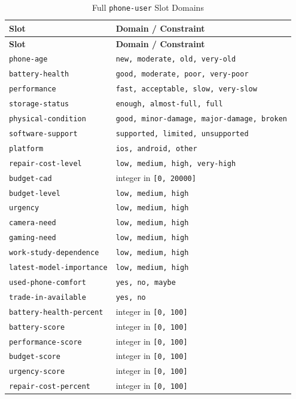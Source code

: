 \documentclass[11pt]{article}
\begin{document}
\begin{longtable}{|L{0.28\textwidth}|L{0.65\textwidth}|}
\caption{Full \texttt{phone-user} Slot Domains}\label{tab:phoneuserslots}\\
\hline
{}
\textbf{Slot} & \textbf{Domain / Constraint} \\ \hline
\hline
\endfirsthead
\hline
{}
\textbf{Slot} & \textbf{Domain / Constraint} \\ \hline
\hline
\endhead
\texttt{phone-age} & \texttt{new, moderate, old, very-old} \\ \hline
\texttt{battery-health} & \texttt{good, moderate, poor, very-poor} \\ \hline
\texttt{performance} & \texttt{fast, acceptable, slow, very-slow} \\ \hline
\texttt{storage-status} & \texttt{enough, almost-full, full} \\ \hline
\texttt{physical-condition} & \texttt{good, minor-damage, major-damage, broken} \\ \hline
\texttt{software-support} & \texttt{supported, limited, unsupported} \\ \hline
\texttt{platform} & \texttt{ios, android, other} \\ \hline
\texttt{repair-cost-level} & \texttt{low, medium, high, very-high} \\ \hline
\texttt{budget-cad} & integer in \texttt{[0, 20000]} \\ \hline
\texttt{budget-level} & \texttt{low, medium, high} \\ \hline
\texttt{urgency} & \texttt{low, medium, high} \\ \hline
\texttt{camera-need} & \texttt{low, medium, high} \\ \hline
\texttt{gaming-need} & \texttt{low, medium, high} \\ \hline
\texttt{work-study-dependence} & \texttt{low, medium, high} \\ \hline
\texttt{latest-model-importance} & \texttt{low, medium, high} \\ \hline
\texttt{used-phone-comfort} & \texttt{yes, no, maybe} \\ \hline
\texttt{trade-in-available} & \texttt{yes, no} \\ \hline
\texttt{battery-health-percent} & integer in \texttt{[0, 100]} \\ \hline
\texttt{battery-score} & integer in \texttt{[0, 100]} \\ \hline
\texttt{performance-score} & integer in \texttt{[0, 100]} \\ \hline
\texttt{budget-score} & integer in \texttt{[0, 100]} \\ \hline
\texttt{urgency-score} & integer in \texttt{[0, 100]} \\ \hline
\texttt{repair-cost-percent} & integer in \texttt{[0, 100]} \\ \hline
\hline
\end{longtable}
\end{document}
